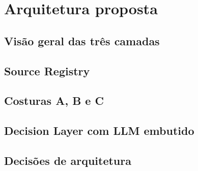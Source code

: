 \chapter{Arquitetura proposta}
\label{chap:arquitetura}


\section{Visão geral das três camadas}
\label{sec:arquitetura-visao-geral-das-tres-camadas}

\section{Source Registry}
\label{sec:arquitetura-source-registry}

\section{Costuras A, B e C}
\label{sec:arquitetura-costuras-a-b-e-c}

\section{Decision Layer com LLM embutido}
\label{sec:arquitetura-decision-layer-com-llm-embutido}

\section{Decisões de arquitetura}
\label{sec:arquitetura-decisoes-de-arquitetura}
